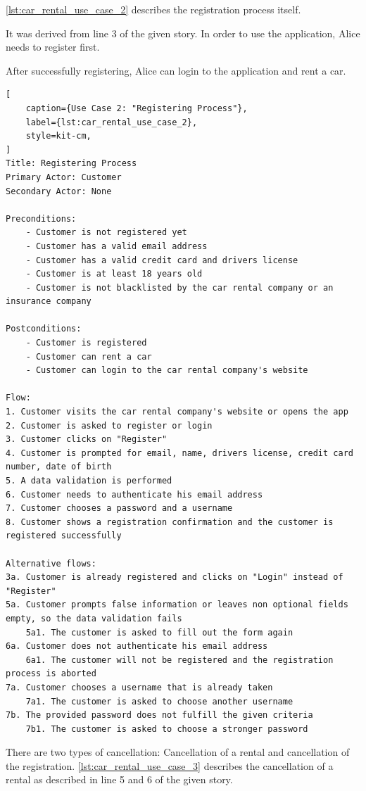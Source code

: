 \autoref{lst:car_rental_use_case_2} describes the registration process itself.

It was derived from line 3 of the given story.
In order to use the application, Alice needs to register first.

After successfully registering, Alice can login to the application and rent a car.

\begin{lstlisting}[
    caption={Use Case 2: "Registering Process"},
    label={lst:car_rental_use_case_2},
    style=kit-cm,
]
Title: Registering Process
Primary Actor: Customer
Secondary Actor: None

Preconditions:
    - Customer is not registered yet
    - Customer has a valid email address
    - Customer has a valid credit card and drivers license
    - Customer is at least 18 years old
    - Customer is not blacklisted by the car rental company or an insurance company

Postconditions:
    - Customer is registered
    - Customer can rent a car
    - Customer can login to the car rental company's website

Flow:
1. Customer visits the car rental company's website or opens the app 
2. Customer is asked to register or login
3. Customer clicks on "Register"
4. Customer is prompted for email, name, drivers license, credit card number, date of birth
5. A data validation is performed
6. Customer needs to authenticate his email address
7. Customer chooses a password and a username
8. Customer shows a registration confirmation and the customer is registered successfully 

Alternative flows:
3a. Customer is already registered and clicks on "Login" instead of "Register"
5a. Customer prompts false information or leaves non optional fields empty, so the data validation fails
    5a1. The customer is asked to fill out the form again
6a. Customer does not authenticate his email address
    6a1. The customer will not be registered and the registration process is aborted
7a. Customer chooses a username that is already taken
    7a1. The customer is asked to choose another username
7b. The provided password does not fulfill the given criteria
    7b1. The customer is asked to choose a stronger password
\end{lstlisting}

There are two types of cancellation: Cancellation of a rental and cancellation of the registration.
\autoref{lst:car_rental_use_case_3} describes the cancellation of a rental as described in line 5 and 6 of the given story.

